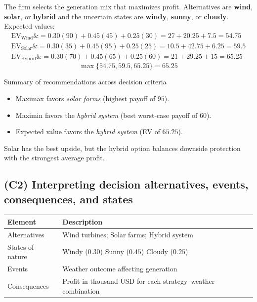\documentclass[11pt]{article}
\begin{document}
	
	The firm selects the generation mix that maximizes profit. Alternatives are \textbf{wind},
	\textbf{solar}, or \textbf{hybrid} and the uncertain states are \textbf{windy},
	\textbf{sunny}, or \textbf{cloudy}. Expected values:
	\[
	\begin{aligned}
		\mathrm{EV}_{\text{Wind}} \&= 0.30(90) + 0.45(45) + 0.25(30) = 27 + 20.25 + 7.5 = 54.75 \\
		\mathrm{EV}_{\text{Solar}} \&= 0.30(35) + 0.45(95) + 0.25(25) = 10.5 + 42.75 + 6.25 = 59.5 \\
		\mathrm{EV}_{\text{Hybrid}} \&= 0.30(70) + 0.45(65) + 0.25(60) = 21 + 29.25 + 15 = 65.25
	\end{aligned}
	\]
	\[
	\max\{54.75, 59.5, 65.25\} = 65.25
	\]
	
	Summary of recommendations across decision criteria
	\begin{itemize}
		\item Maximax favors \emph{solar farms} (highest payoff of $95$).
		\item Maximin favors the \emph{hybrid system} (best worst-case payoff of $60$).
		\item Expected value favors the \emph{hybrid system} (EV of $65.25$).
	\end{itemize}
	
	
	Solar has the best upside, but the hybrid option balances downside protection with the strongest average profit.
	
	\subsection*{(C2) Interpreting decision alternatives, events, consequences, and states}
	
	\hypertarget{problem2-c2}{}
	
	\begin{center}
		\begin{tabular}{ll}
			\toprule
			Element & Description \\
			\midrule
			Alternatives & Wind turbines; Solar farms; Hybrid system \\
			States of nature & Windy
			($0.30$)
			Sunny
			($0.45$)
			Cloudy
			($0.25$) \\
			Events & Weather outcome affecting generation \\
			Consequences & Profit in thousand USD for each strategy–weather combination \\
			\bottomrule
		\end{tabular}
	\end{center}
	
\end{document}
